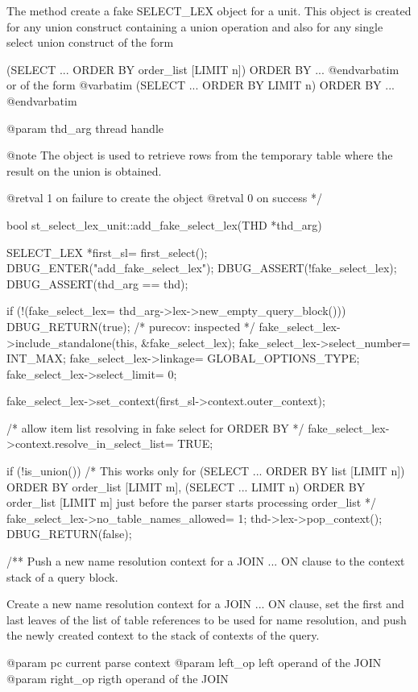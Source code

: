 The method create a fake S\+E\+L\+E\+C\+T\+\_\+\+L\+EX object for a unit. This object is created for any union construct containing a union operation and also for any single select union construct of the form \begin{DoxyVerb}    (SELECT ... ORDER BY order_list [LIMIT n]) ORDER BY ... 
    @endvarbatim
    or of the form
    @varbatim
    (SELECT ... ORDER BY LIMIT n) ORDER BY ...
    @endvarbatim
  
  @param thd_arg       thread handle

  @note
    The object is used to retrieve rows from the temporary table
    where the result on the union is obtained.

  @retval
    1     on failure to create the object
  @retval
    0     on success
*/

bool st_select_lex_unit::add_fake_select_lex(THD *thd_arg)
{
  SELECT_LEX *first_sl= first_select();
  DBUG_ENTER("add_fake_select_lex");
  DBUG_ASSERT(!fake_select_lex);
  DBUG_ASSERT(thd_arg == thd);

  if (!(fake_select_lex= thd_arg->lex->new_empty_query_block()))
    DBUG_RETURN(true);       /* purecov: inspected */
  fake_select_lex->include_standalone(this, &fake_select_lex);
  fake_select_lex->select_number= INT_MAX;
  fake_select_lex->linkage= GLOBAL_OPTIONS_TYPE;
  fake_select_lex->select_limit= 0;

  fake_select_lex->set_context(first_sl->context.outer_context);

  /* allow item list resolving in fake select for ORDER BY */
  fake_select_lex->context.resolve_in_select_list= TRUE;

  if (!is_union())
  {
    /* 
      This works only for 
      (SELECT ... ORDER BY list [LIMIT n]) ORDER BY order_list [LIMIT m],
      (SELECT ... LIMIT n) ORDER BY order_list [LIMIT m]
      just before the parser starts processing order_list
    */ 
    fake_select_lex->no_table_names_allowed= 1;
  }
  thd->lex->pop_context();
  DBUG_RETURN(false);
}


/**
  Push a new name resolution context for a JOIN ... ON clause to the
  context stack of a query block.

    Create a new name resolution context for a JOIN ... ON clause,
    set the first and last leaves of the list of table references
    to be used for name resolution, and push the newly created
    context to the stack of contexts of the query.

  @param pc        current parse context
  @param left_op   left  operand of the JOIN
  @param right_op  rigth operand of the JOIN


\end{DoxyVerb}
